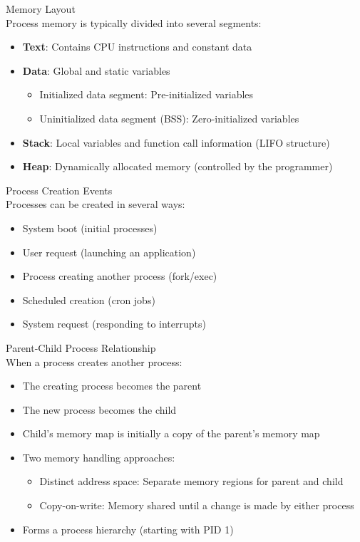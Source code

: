 \begin{definition}{Memory Layout}\\
    Process memory is typically divided into several segments:
    \begin{itemize}
        \item \textbf{Text}: Contains CPU instructions and constant data
        \item \textbf{Data}: Global and static variables
            \begin{itemize}
                \item Initialized data segment: Pre-initialized variables
                \item Uninitialized data segment (BSS): Zero-initialized variables
            \end{itemize}
        \item \textbf{Stack}: Local variables and function call information (LIFO structure)
        \item \textbf{Heap}: Dynamically allocated memory (controlled by the programmer)
    \end{itemize}
\end{definition}

\begin{definition}{Process Creation Events}\\
    Processes can be created in several ways:
    \begin{itemize}
        \item System boot (initial processes)
        \item User request (launching an application)
        \item Process creating another process (fork/exec)
        \item Scheduled creation (cron jobs)
        \item System request (responding to interrupts)
    \end{itemize}
\end{definition}

\begin{definition}{Parent-Child Process Relationship}\\
    When a process creates another process:
    \begin{itemize}
        \item The creating process becomes the parent
        \item The new process becomes the child
        \item Child's memory map is initially a copy of the parent's memory map
        \item Two memory handling approaches:
            \begin{itemize}
                \item Distinct address space: Separate memory regions for parent and child
                \item Copy-on-write: Memory shared until a change is made by either process
            \end{itemize}
        \item Forms a process hierarchy (starting with PID 1)
    \end{itemize}
\end{definition}

